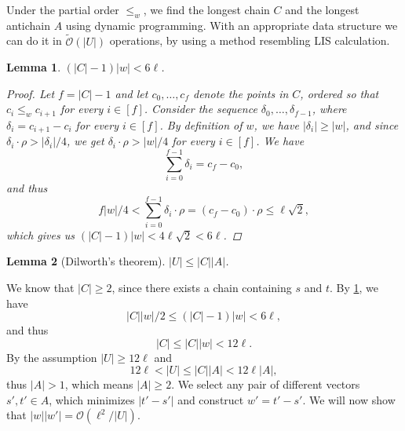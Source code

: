 \documentclass[11pt, letterpaper]{article}
\theoremstyle{plain}
\newtheorem{lemma}{Lemma}
\theoremstyle{definition}
\theoremstyle{remark}
\renewcommand{\O}{\mathcal{O}}
\newcommand{\tO}{\tilde{\mathcal{O}}}
\begin{document}
Under the partial order $\le_w$, we find the longest chain $C$ and the longest antichain $A$ using dynamic programming.
With an appropriate data structure we can do it in $\tO(|U|)$ operations, by using a method resembling LIS calculation.

\begin{lemma}\label{C_ineq}
	$(|C| - 1) |w| < 6\ell$. 
	\begin{proof}
		Let $f = |C| - 1$ and
		let $c_0, \dots, c_{f}$ denote the points in $C$, ordered so that $c_i \le_w c_{i + 1}$ for every $i \in [f]$.
		Consider the sequence $\delta_0, \dots, \delta_{f - 1}$, where $\delta_i = c_{i + 1} - c_i$ for every $i \in [f]$.
		By definition of $w$, we have $|\delta_i| \ge |w|$,
		and since $\delta_i \cdot \rho > |\delta_i| / 4$, we get
		$\delta_i \cdot \rho > |w| / 4$ for every $i \in [f]$.
		We have
		\[ \sum_{i = 0}^{f - 1} \delta_i = c_f - c_0,\]
		and thus
		\[ f|w| / 4 < \sum_{i = 0}^{f - 1} \delta_i \cdot \rho = (c_f - c_0) \cdot \rho \le \ell \sqrt{2}, \]
		which gives us $(|C| - 1)|w| < 4\ell \sqrt{2} < 6\ell$.
	\end{proof}
\end{lemma}

\begin{lemma}[Dilworth's theorem]\label{dilworth}
	$|U| \le |C| |A|$.
\end{lemma}

We know that $|C| \ge 2$, since there exists a chain containing $s$ and $t$.
By \cref{C_ineq}, we have
\[ |C||w| / 2 \le (|C| - 1)|w| < 6\ell, \]
and thus
\[ |C| \le |C||w| < 12\ell. \]
By the assumption $|U| \ge 12\ell$ and 
\[12 \ell < |U| \le |C| |A| < 12\ell|A|,\]
thus $|A| > 1$, which means $|A| \ge 2$.
We select any pair of different vectors $s', t' \in A$, which minimizes $|t' - s'|$ and construct $w' = t' - s'$.
We will now show that $|w||w'| = \O(\ell^2 / |U|)$.
\end{document}
